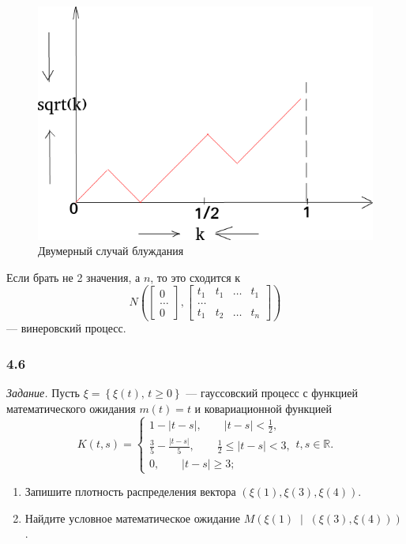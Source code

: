 \begin{enumerate}[label=\alph*)]
  \begin{figure}[h!]
    \centering
    \includegraphics[width=.4\textwidth]{./pictures/4_5.png}
    \caption{Двумерный случай блуждания}
    \label{fig:45}
  \end{figure}

  Если брать не 2 значения, а $n$, то это сходится к
  $$N \left(
      \begin{bmatrix}
        0 \\
        \dotsc \\
        0
      \end{bmatrix},
      \begin{bmatrix}
        t_1 & t_1 & \dotsc & t_1 \\
        \dotsc \\
        t_1 & t_2 & \dotsc & t_n
      \end{bmatrix}
    \right) $$
  --- винеровский процесс.
\end{enumerate}

\subsubsection*{4.6}

\textit{Задание.}
Пусть $ \xi = \left\{ \xi \left( t \right), \, t \geq 0 \right\} $ ---
гауссовский процесс с функцией математического ожидания $m \left( t \right) = t$
и ковариационной функцией
$$K \left( t, s \right) =
  \begin{cases}
    1 - \left| t - s \right|, \qquad \left| t - s \right| < \frac{1}{2}, \\
    \frac{3}{5} - \frac{ \left| t - s \right| }{5}, \qquad \frac{1}{2} \leq \left|t-s\right| < 3, \\
    0, \qquad \left| t - s \right| \geq 3;
  \end{cases}
  t, s \in \mathbb{R}.$$
\begin{enumerate}[label=\alph*)]
  \item Запишите плотность распределения вектора
  $ \left( \xi \left( 1 \right), \xi \left( 3 \right), \xi \left( 4 \right) \right) $.
  \item Найдите условное математическое ожидание
  $M \left(
    \xi \left( 1 \right) \; \middle| \; \left( \xi \left( 3 \right), \xi \left( 4 \right) \right)
  \right) $.
\end{enumerate}

